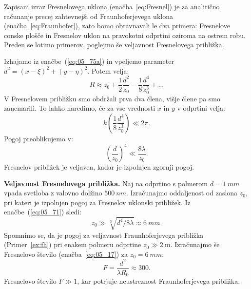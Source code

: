 Zapisani izraz Fresnelovega uklona (enačba~\ref{eq:Fresnel}) je za analitično 
računanje precej zahtevnejši od Fraunhoferjevega uklona 
(enačba~\ref{eq:Fraunhofer}), zato bomo obravnavali
le dva primera: Fresnelove conske plošče in Fresnelov uklon na pravokotni 
odprtini oziroma na ostrem robu. 
Preden se lotimo primerov, poglejmo še veljavnost Fresnelovega približka.

Izhajamo iz enačbe~(\ref{eq:05_75a}) in 
vpeljemo parameter $d^2 = (x-\xi)^2+(y-\eta)^2$. Potem velja:
\begin{equation}
R \approx z_0 + \frac{1}{2}\frac{d^2}{z_0} - \frac{1}{8}\frac{d^4}{z_0^3} + ...
\label{eq:05_69}
\end{equation}
V Fresnelovem približku smo obdržali prva dva člena, višje člene pa 
smo zanemarili. To lahko naredimo, če za vse vrednosti $x$ in $y$ v odprtini velja:
\begin{equation}
k\left( \frac{1}{8}\frac{d^4}{z_0^3}\right) \ll 2\pi.
\label{eq:05_70}
\end{equation}
Pogoj preoblikujemo v:
\begin{equation}
\left(\frac{d}{z_0}\right)^4 \ll \frac{8\lambda}{z_0}.
\label{eq:05_71}
\end{equation}
Fresnelov približek je veljaven, kadar je izpolnjen zgornji pogoj.
\begin{example}{\bf Veljavnost Fresnelovega približka.}
Naj na odprtino s polmerom $d=1~\si{mm}$ vpada svetloba
z valovno dolžino $500~\si{nm}$. Izračunajmo oddaljenost
od zaslona $z_0$, pri kateri je izpolnjen pogoj za Fresnelov
uklonski približek. Iz enačbe~(\ref{eq:05_71}) sledi:
\begin{equation}
z_0\gg \sqrt[3]{d^4/8\lambda} \approx 6~\si{mm}.
\label{eq:05_73}
\end{equation}
Spomnimo se, da je pogoj za veljavnost Fraunhoferjevega
približka (Primer~\ref{ex:fh}) pri enakem polmeru odprtine 
$z_0 \gg 2~\si{\metre}$. 
Izračunajmo še Fresnelovo število (enačba~\ref{eq:05_17})
za $z_0=6~\si{mm}$:
\begin{equation}
F = \frac{d^2}{\lambda R_0} \approx 300. 
\label{eq:05_74}
\end{equation}
Fresnelovo število $F\gg1$, kar potrjuje neustreznost Fraunhoferjevega približka.
\end{example}

